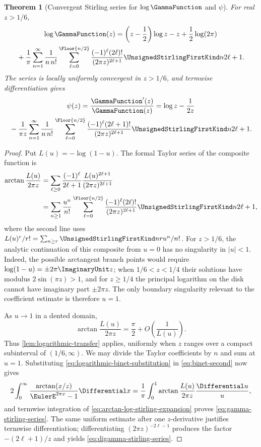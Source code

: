 \documentclass[11pt,a4paper,oneside,openany]{book}
\newtheorem{theorem}{Theorem}[chapter]
\theoremstyle{definition}
\theoremstyle{remark}
\begin{document}
\begin{theorem}[Convergent Stirling series for $\log\GammaFunction$ and $\psi$]
\label{thm:gamma-stirling-series}
For real $z>1/6$,
\begin{multline}
\label{eq:gamma-stirling-series}
 \log\GammaFunction(z)
 =\left(z-\frac12\right)\log z-z+\frac12\log(2\pi)\\
 {}+\frac1\pi\sum_{n=1}^{\infty}\frac1{n\,n!}
 \sum_{\ell=0}^{\Floor{n/2}}
 \frac{(-1)^\ell(2\ell)!}{(2\pi z)^{2\ell+1}}
 \UnsignedStirlingFirstKind n{2\ell+1}.
\end{multline}
The series is locally uniformly convergent in $z>1/6$, and termwise
differentiation gives
\begin{multline}
\label{eq:digamma-stirling-series}
 \psi(z)=\frac{\GammaFunction'(z)}{\GammaFunction(z)}
 =\log z-\frac1{2z}\\
 {}-\frac1{\pi z}\sum_{n=1}^{\infty}\frac1{n\,n!}
 \sum_{\ell=0}^{\Floor{n/2}}
 \frac{(-1)^\ell(2\ell+1)!}{(2\pi z)^{2\ell+1}}
 \UnsignedStirlingFirstKind n{2\ell+1}.
\end{multline}
\end{theorem}
\begin{proof}
Put $L(u)=-\log(1-u)$.  The formal Taylor series of the composite function is
\begin{align}
 \arctan\frac{L(u)}{2\pi z}
 &=\sum_{\ell\ge0}\frac{(-1)^\ell}{2\ell+1}
   \frac{L(u)^{2\ell+1}}{(2\pi z)^{2\ell+1}}\notag\\
 &=\sum_{n\ge1}\frac{u^n}{n!}
   \sum_{\ell=0}^{\Floor{n/2}}
   \frac{(-1)^\ell(2\ell)!}{(2\pi z)^{2\ell+1}}
   \UnsignedStirlingFirstKind n{2\ell+1},
 \label{eq:arctan-log-stirling-expansion}
\end{align}
where the second line uses
$L(u)^r/r!=\sum_{n\ge r}\UnsignedStirlingFirstKind nr u^n/n!$.
For $z>1/6$, the analytic continuation of this composite from $u=0$ has no
singularity in $|u|<1$.  Indeed, the possible arctangent branch points would
require $\log(1-u)=\pm2\pi \ImaginaryUnit z$; when $1/6<z<1/4$ their solutions have modulus
$2\sin(\pi z)>1$, and for $z\ge1/4$ the principal logarithm on the disk cannot
have imaginary part $\pm2\pi z$.  The only boundary singularity relevant to the
coefficient estimate is therefore $u=1$.

As $u\to1$ in a dented domain,
\[
 \arctan\frac{L(u)}{2\pi z}
 =\frac\pi2+O\!\left(\frac1{L(u)}\right).
\]
Thus \cref{lem:logarithmic-transfer} applies, uniformly when $z$ ranges over a
compact subinterval of $(1/6,\infty)$.  We may divide the Taylor coefficients by
$n$ and sum at $u=1$.  Substituting \eqref{eq:logarithmic-binet-substitution} in
\eqref{eq:binet-second} now gives
\[
 2\int_0^\infty\frac{\arctan(x/z)}{\EulerE^{2\pi x}-1}\Differential x
 =\frac1\pi\int_0^1\arctan\frac{L(u)}{2\pi z}\frac{\Differential u}{u},
\]
and termwise integration of
\eqref{eq:arctan-log-stirling-expansion} proves
\eqref{eq:gamma-stirling-series}.  The same uniform estimate after one
$z$-derivative justifies termwise differentiation; differentiating
$(2\pi z)^{-2\ell-1}$ produces the factor $-(2\ell+1)/z$ and yields
\eqref{eq:digamma-stirling-series}.
\end{proof}
\end{document}
